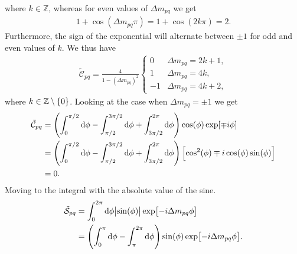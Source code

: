         where $k \in \mathbb{Z}$, whereas for even values of $\Delta m_{pq}$ we
        get
        \begin{align}
            1 + \cos(\Delta m_{pq} \pi)
            = 1 + \cos(2k \pi) = 2.
        \end{align}
        Furthermore, the sign of the exponential will alternate between $\pm 1$
        for odd and even values of $k$.
        We thus have
        \begin{align}
            \tilde{\mathcal{C}}_{pq}
            =
            \frac{4}{1 - (\Delta m_{pq})^2}
            \begin{cases}
                0 & \Delta m_{pq} = 2k + 1, \\
                1 & \Delta m_{pq} = 4k, \\
                -1 & \Delta m_{pq} = 4k + 2,
            \end{cases}
        \end{align}
        where $k \in \mathbb{Z} \setminus \left\{ 0 \right\}$.
        Looking at the case when $\Delta m_{pq} = \pm 1$ we get
        \begin{align}
            \tilde{\mathcal{C}}_{pq}
            &=
            \left( 
                \int_{0}^{\pi/2}
                \dd \phi
                -
                \int_{\pi/2}^{3\pi/2}
                \dd \phi
                +
                \int_{3\pi/2}^{2\pi}
                \dd \phi
             \right)
            \cos(\phi)
            \exp[\mp i\phi]
            \\
            &=
            \left( 
                \int_{0}^{\pi/2}
                \dd \phi
                -
                \int_{\pi/2}^{3\pi/2}
                \dd \phi
                +
                \int_{3\pi/2}^{2\pi}
                \dd \phi
             \right)
            \left[ 
                \cos^2(\phi)
                \mp i \cos(\phi)\sin(\phi)
             \right]
            \\
            &= 0.
        \end{align}
        Moving to the integral with the absolute value of the sine.
        \begin{align}
            \tilde{\mathcal{S}}_{pq}
            &= \int_{0}^{2\pi} \dd \phi
            \abs{\sin(\phi)}
            \exp[-i\Delta m_{pq} \phi]
            \\
            &= \left( 
                \int_{0}^{\pi} \dd \phi
                - \int_{\pi}^{2\pi} \dd \phi
             \right)
            \sin(\phi) \exp[-i\Delta m_{pq} \phi].
        \end{align}
